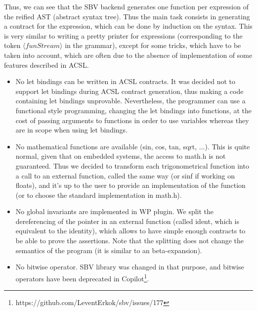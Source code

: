 \documentclass[a4paper,11pt,final]{article}
\begin{document}
	Thus, we can see that the SBV backend generates one function per expression of the reified AST (abstract syntax tree). Thus the main task consists in generating a contract for the expression, which can be done by induction on the syntax. This is very similar to writing a pretty printer for expressions (corresponding to the token $\langle funStream \rangle$ in the grammar), except for some tricks, which have to be taken into account, which are often due to the absence of implementation of some features described in ACSL.
	
	\begin{itemize}
		\item No let bindings can be written in ACSL contracts.
		\subitem It was decided not to support let bindings during ACSL contract generation, thus making a code containing let bindings unprovable. Nevertheless, the programmer can use a functional style programming, changing the let bindings into functions, at the cost of passing arguments to functions in order to use variables whereas they are in scope when using let bindings.
		\item No mathematical functions are available (sin, cos, tan, sqrt, ...).
		\subitem This is quite normal, given that on embedded systems, the access to math.h is not guaranteed. Thus we decided to transform each trigonometrical function into a call to an external function, called the same way (or sinf if working on floats), and it's up to the user to provide an implementation of the function (or to choose the standard implementation in math.h).
		\item No global invariants are implemented in WP plugin.
		\subitem We split the dereferencing of the pointer in an external function (called ident, which is equivalent to the identity), which allows to have simple enough contracts to be able to prove the assertions. Note that the splitting does not change the semantics of the program (it is similar to an beta-expansion).
		\item No bitwise operator.
		\subitem SBV library was changed in that purpose, and bitwise operators have been deprecated in Copilot\footnote{https://github.com/LeventErkok/sbv/issues/177}.
	\end{itemize}
	
\end{document}
